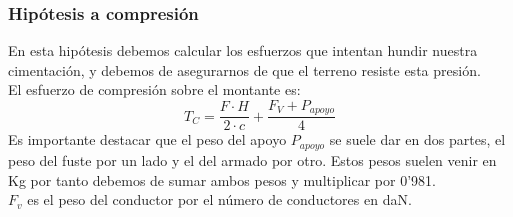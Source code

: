 \documentclass{article}
\begin{document}
            \newpage
            \subsubsection{Hipótesis a compresión}
            {
            \begin{figure}
            \end{figure}
            En esta hipótesis debemos calcular los esfuerzos que intentan hundir nuestra cimentación, y debemos de asegurarnos de que el terreno resiste esta presión.\\
            
            El esfuerzo de compresión sobre el montante es:
            $$
            T_{C}=\frac{F \cdot H}{2 \cdot c}+\frac{F_{V}+P_{a p o y o}}{4}
            $$
            Es importante destacar que el peso del apoyo $P_{apoyo}$ se suele dar en dos partes, el peso del fuste por un lado y el del armado por otro.
            Estos pesos suelen venir en Kg por tanto debemos de sumar ambos pesos y multiplicar por 0'981.
            \\
            
            $F_v$ es el peso del conductor por el número de conductores en daN.
            
}
\end{document}
